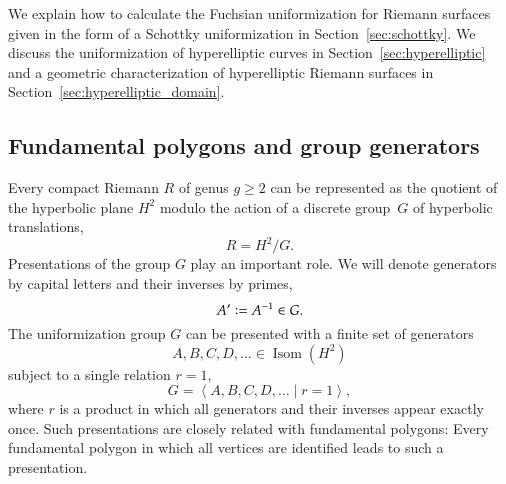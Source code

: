 \documentclass[Thesis]{subfiles}
\begin{document}
We explain how to calculate the Fuchsian uniformization for Riemann
surfaces given in the form of a Schottky uniformization in
Section~\ref{sec:schottky}. We discuss the uniformization of
hyperelliptic curves in Section~\ref{sec:hyperelliptic} and a
geometric characterization of hyperelliptic Riemann surfaces in
Section~\ref{sec:hyperelliptic_domain}. 


\subsection{Fundamental polygons and group generators}
\label{sec:polygons_generators}

Every compact Riemann $R$ of genus $g\geq 2$ can be represented as the
quotient of the hyperbolic plane $H^{2}$ modulo the action of a discrete
group~$G$ of hyperbolic translations,
\begin{equation}
R=H^{2} / G.
\end{equation}
Presentations of the group $G$ play an important role. We will denote
generators by capital letters and their inverses by primes,
\begin{equation}
  A'\vcentcolon=A^{-1}\in G.
\end{equation}
The uniformization group $G$ can be presented with a finite set of
generators 
\begin{equation*}
A,B,C,D,\ldots\in\operatorname{Isom}(H^{2})
\end{equation*}
subject to a single relation $r=1$,
\begin{equation}
G=\left<A,B,C,D,\ldots\mid r=1\right>,
\end{equation}
where $r$ is a product in which all generators and their inverses
appear exactly once. Such presentations are closely related with
fundamental polygons: Every fundamental polygon in which all vertices
are identified leads to such a presentation.
\end{document}
